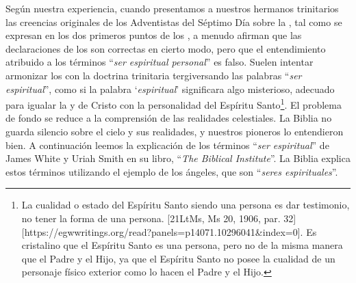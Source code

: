Según nuestra experiencia, cuando presentamos a nuestros hermanos trinitarios las creencias originales de los Adventistas del Séptimo Día sobre la , tal como se expresan en los dos primeros puntos de los , a menudo afirman que las declaraciones de los  son correctas en cierto modo, pero que el entendimiento atribuido a los términos “\textit{ser espiritual personal}” es falso. Suelen intentar armonizar los  con la doctrina trinitaria tergiversando las palabras “\textit{ser espiritual}”, como si la palabra ‘\textit{espiritual}’ significara algo misterioso, adecuado para igualar la  y de Cristo con la personalidad del Espíritu Santo\footnote{La cualidad o estado del Espíritu Santo siendo una persona es dar testimonio, no tener la forma de una persona. [21LtMs, Ms 20, 1906, par. 32][https://egwwritings.org/read?panels=p14071.10296041&index=0]. Es cristalino que el Espíritu Santo es una persona, pero no de la misma manera que el Padre y el Hijo, ya que el Espíritu Santo no posee la cualidad de un personaje físico exterior como lo hacen el Padre y el Hijo.}. El problema de fondo se reduce a la comprensión de las realidades celestiales. La Biblia no guarda silencio sobre el cielo y sus realidades, y nuestros pioneros lo entendieron bien. A continuación leemos la explicación de los términos “\textit{ser espiritual}” de James White y Uriah Smith en su libro, “\textit{The Biblical Institute}”. La Biblia explica estos términos utilizando el ejemplo de los ángeles, que son “\textit{seres espirituales}”.


